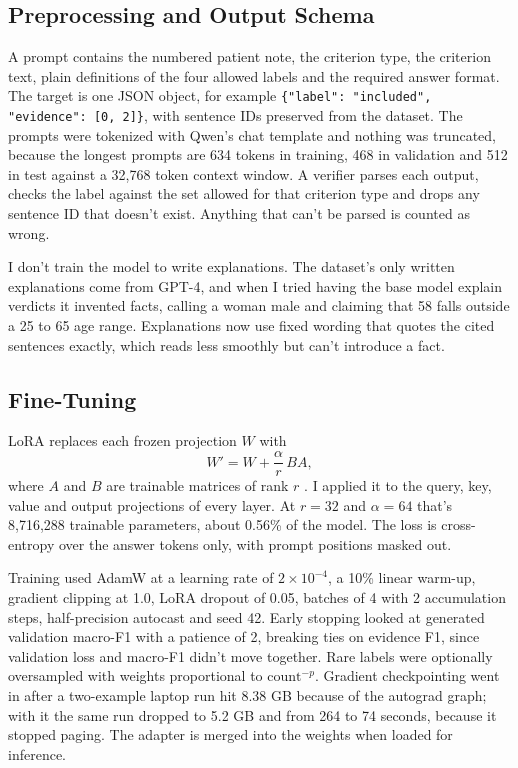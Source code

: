 \documentclass[conference]{IEEEtran}
\begin{document}
\subsection{Preprocessing and Output Schema}

A prompt contains the numbered patient note, the criterion type, the criterion text, plain definitions of the four allowed labels and the required answer format. The target is one JSON object, for example \texttt{\{"label": "included", "evidence": [0, 2]\}}, with sentence IDs preserved from the dataset. The prompts were tokenized with Qwen's chat template and nothing was truncated, because the longest prompts are 634 tokens in training, 468 in validation and 512 in test against a 32,768 token context window. A verifier parses each output, checks the label against the set allowed for that criterion type and drops any sentence ID that doesn't exist. Anything that can't be parsed is counted as wrong.

I don't train the model to write explanations. The dataset's only written explanations come from GPT-4, and when I tried having the base model explain verdicts it invented facts, calling a woman male and claiming that 58 falls outside a 25 to 65 age range. Explanations now use fixed wording that quotes the cited sentences exactly, which reads less smoothly but can't introduce a fact.

\subsection{Fine-Tuning}

LoRA replaces each frozen projection $W$ with
\begin{equation}
W' = W + \frac{\alpha}{r}\, B A,
\end{equation}
where $A$ and $B$ are trainable matrices of rank $r$ \cite{hu2022lora}. I applied it to the query, key, value and output projections of every layer. At $r=32$ and $\alpha=64$ that's 8,716,288 trainable parameters, about 0.56\% of the model. The loss is cross-entropy over the answer tokens only, with prompt positions masked out.

Training used AdamW at a learning rate of $2\times10^{-4}$, a 10\% linear warm-up, gradient clipping at 1.0, LoRA dropout of 0.05, batches of 4 with 2 accumulation steps, half-precision autocast and seed 42. Early stopping looked at generated validation macro-F1 with a patience of 2, breaking ties on evidence F1, since validation loss and macro-F1 didn't move together. Rare labels were optionally oversampled with weights proportional to $\mathrm{count}^{-p}$. Gradient checkpointing went in after a two-example laptop run hit 8.38 GB because of the autograd graph; with it the same run dropped to 5.2 GB and from 264 to 74 seconds, because it stopped paging. The adapter is merged into the weights when loaded for inference.
\end{document}

